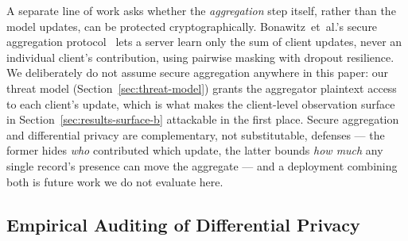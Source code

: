 A separate line of work asks whether the \emph{aggregation} step
itself, rather than the model updates, can be protected
cryptographically. Bonawitz~et~al.'s secure aggregation
protocol~\cite{bonawitz2017practical} lets a server learn only the sum
of client updates, never an individual client's contribution, using
pairwise masking with dropout resilience. We deliberately do not
assume secure aggregation anywhere in this paper: our threat model
(Section~\ref{sec:threat-model}) grants the aggregator plaintext
access to each client's update, which is what makes the client-level
observation surface in Section~\ref{sec:results-surface-b} attackable
in the first place. Secure aggregation and differential privacy are
complementary, not substitutable, defenses --- the former hides
\emph{who} contributed which update, the latter bounds \emph{how much}
any single record's presence can move the aggregate --- and a
deployment combining both is future work we do not evaluate here.

\subsection{Empirical Auditing of Differential Privacy}
\label{sec:related-auditing}

